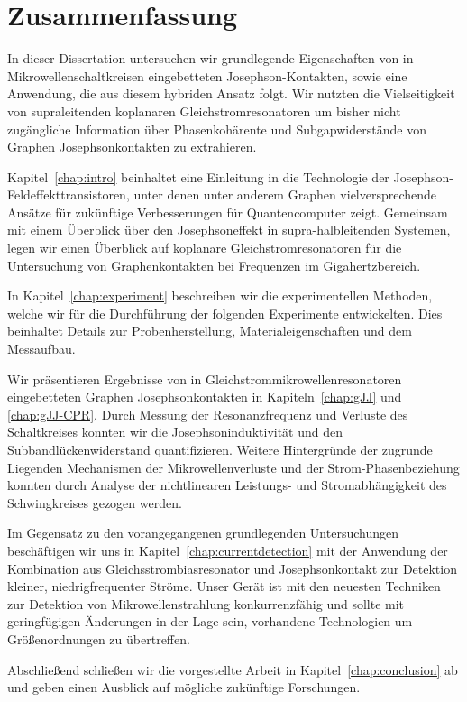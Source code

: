 
\chapter*{Zusammenfassung}

{%
In dieser Dissertation untersuchen wir grundlegende Eigenschaften von in Mikrowellenschaltkreisen eingebetteten Josephson-Kontakten, sowie eine Anwendung, die aus diesem hybriden Ansatz folgt.
%
Wir nutzten die Vielseitigkeit von supraleitenden koplanaren Gleichstromresonatoren um bisher nicht zugängliche Information über Phasenkohärente und Subgapwiderstände von Graphen Josephsonkontakten zu extrahieren.

\noindent \newline
Kapitel~\ref{chap:intro} beinhaltet eine Einleitung in die Technologie der Josephson-Feldeffekttransistoren, unter denen unter anderem Graphen vielversprechende Ansätze für zukünftige Verbesserungen für Quantencomputer zeigt.
%
Gemeinsam mit einem Überblick über den Josephsoneffekt in supra-halbleitenden Systemen, legen wir einen Überblick auf koplanare Gleichstromresonatoren für die Untersuchung von Graphenkontakten bei Frequenzen im Gigahertzbereich.

\noindent \newline
In Kapitel~\ref{chap:experiment} beschreiben wir die experimentellen Methoden, welche wir für die Durchführung der folgenden Experimente entwickelten.
%
Dies beinhaltet Details zur Probenherstellung, Materialeigenschaften und dem Messaufbau.

\noindent \newline
Wir präsentieren Ergebnisse von in Gleichstrommikrowellenresonatoren eingebetteten Graphen Josephsonkontakten in Kapiteln~\ref{chap:gJJ} und \ref{chap:gJJ-CPR}.
%
Durch Messung der Resonanzfrequenz und Verluste des Schaltkreises konnten wir die Josephsoninduktivität und den Subbandlückenwiderstand quantifizieren.
%
Weitere Hintergründe der zugrunde Liegenden Mechanismen der Mikrowellenverluste und der Strom-Phasenbeziehung konnten durch Analyse der nichtlinearen Leistungs- und Stromabhängigkeit des Schwingkreises gezogen werden.

\noindent \newline
Im Gegensatz zu den vorangegangenen grundlegenden Untersuchungen beschäftigen wir uns in Kapitel~\ref{chap:currentdetection} mit der Anwendung der Kombination aus Gleichsstrombiasresonator und Josephsonkontakt zur Detektion kleiner, niedrigfrequenter Ströme.
%
Unser Gerät ist mit den neuesten Techniken zur Detektion von Mikrowellenstrahlung konkurrenzfähig und sollte mit geringfügigen Änderungen in der Lage sein, vorhandene Technologien um Größenordnungen zu übertreffen.

\noindent \newline
Abschließend schließen wir die vorgestellte Arbeit in Kapitel~\ref{chap:conclusion} ab und geben einen Ausblick auf mögliche zukünftige Forschungen.

}

